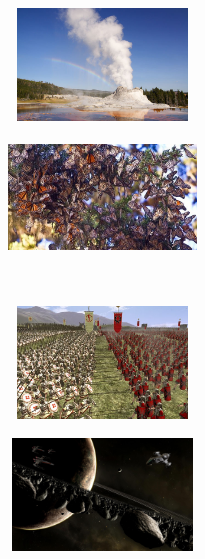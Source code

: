 \documentclass[10pt]{beamer}
\begin{document}
\begin{frame}

\begin{figure}
  \begin{subfigure}[b]{.45\linewidth}
    \centering
    \includegraphics[height=3cm,width=5cm]{images/faithful.jpg}
  \end{subfigure} \quad
  \begin{subfigure}[b]{.45\linewidth}
    \centering
    \includegraphics[height=3cm,width=5cm]{images/butterflies.jpg}
  \end{subfigure}\\ \vspace{1em}
  \begin{subfigure}[b]{.45\linewidth}
    \centering
    \includegraphics[height=3cm,width=5cm]{images/totalwar.jpg}
  \end{subfigure} \quad
  \begin{subfigure}[b]{.45\linewidth} 
    \includegraphics[height=3cm,width=5cm]{images/saturn.jpg}
  \end{subfigure}%
\end{figure}

\end{frame}
\end{document}
